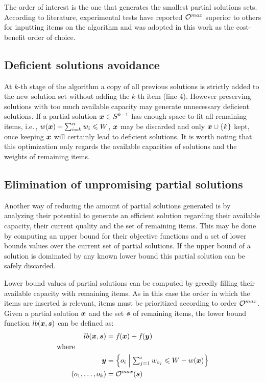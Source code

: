 The order of interest is the one that generates the smallest partial solutions sets.
According to literature, experimental tests have reported $\mathcal{O}^{max}$
superior to others for inputting items on the algorithm and was adopted
in this work as the cost-benefit order of choice.

\subsection{Deficient solutions avoidance}
\label{subsec:deficient}
At $k$-th stage of the algorithm
a copy of all previous solutions is strictly added to the
new solution set without adding the $k$-th item (line 4).
However preserving solutions with too much available capacity
may generate unnecessary deficient solutions.
If a partial solution $\boldsymbol{x} \in S^{k-1}$ has enough
space to fit all remaining items, i.e.\,, $w(\boldsymbol{x}) + \sum_{i=k}^n w_i \leqslant W$,
$\boldsymbol{x}$ may be discarded and only $\boldsymbol{x} \cup \{k\}$ kept, once
keeping $\boldsymbol{x}$ will certainly lead to deficient solutions.
It is worth noting that this optimization only regards the available capacities of solutions
and the weights of remaining items.


\subsection{Elimination of unpromising partial solutions}
\label{subsec:unpromissing}
Another way of reducing the amount of partial solutions
generated is by analyzing their potential to generate an efficient solution
regarding their available capacity, their current quality and the set of remaining items.
This may be done by computing an upper bound for their objective functions
and a set of lower bounds values over the current set of partial solutions.
If the upper bound of a solution is dominated by any known lower bound
this partial solution can be safely discarded.

Lower bound values of partial solutions can be computed by greedly filling
their available capacity with remaining items.
As in this case the order in which the items are inserted is relevant, 
items must be prioritized according to order $\mathcal{O}^{max}$.
Given a partial solution $\boldsymbol{x}$ and the set $\boldsymbol{s}$ of remaining items,
the lower bound function $lb(\boldsymbol{x}, \boldsymbol{s})$ can be defined as:
\begin{align*}
    lb(\boldsymbol{x}, \boldsymbol{s}) &= f_{}(\boldsymbol{x}) + f_{}(\boldsymbol{y}) \\
  \text{where} \phantom{mmmmm} \\
    \boldsymbol{y} &= \left\{ o_i \;\middle|\; \textstyle\sum_{j=1}^i w_{o_j} \leqslant W - w(\boldsymbol{x}) \right\} \\
    (o_1, \ldots, o_k) &= \mathcal{O}^{max}(\boldsymbol{s})
\end{align*}

